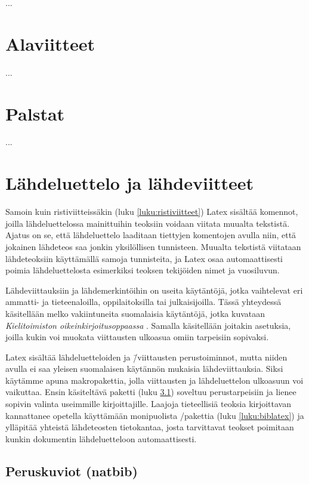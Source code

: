 ...

\section{Alaviitteet}
\label{luku:alaviitteet}

...

\section{Palstat}
\label{luku:palstat}

...

\section{Lähdeluettelo ja lähdeviitteet}
\label{luku:lähteet}

Samoin kuin ristiviitteissäkin (luku \ref{luku:ristiviitteet}) Latex
sisältää komennot, joilla lähdeluettelossa mainittuihin teoksiin voidaan
viitata muualta tekstistä. Ajatus on se, että lähdeluettelo laaditaan
tiettyjen komentojen avulla niin, että jokainen lähdeteos saa jonkin
yksilöllisen tunnisteen. Muualta tekstistä viitataan lähdeteoksiin
käyttämällä samoja tunnisteita, ja Latex osaa automaattisesti poimia
lähdeluettelosta esimerkiksi teoksen tekijöiden nimet ja vuosiluvun.

Lähdeviittauksiin ja lähdemerkintöihin on useita käytäntöjä, jotka
vaihtelevat eri ammatti- ja tieteen\-aloilla, oppilaitoksilla tai
julkaisijoilla. Tässä yhteydessä käsitellään melko vakiintuneita
suomalaisia käytäntöjä, jotka kuvataan \emph{Kielitoimiston
  oikein\-kir\-joi\-tus\-oppaas\-sa} \parencite{kt_oik}. Samalla
käsitellään joitakin asetuksia, joilla kukin voi muokata viittausten
ulkoasua omiin tarpeisiin sopivaksi.

Latex sisältää lähdeluetteloiden ja \=/viittausten perustoiminnot, mutta
niiden avulla ei saa yleisen suomalaisen käytännön mukaisia
lähdeviittauksia. Siksi käytämme apuna makropakettia, jolla viittausten
ja lähdeluettelon ulkoasuun voi vaikuttaa. Ensin käsiteltävä paketti
 (luku \ref{luku:natbib}) soveltuu perustarpeisiin ja
lienee sopivin valinta useimmille kirjoittajille. Laajoja tieteellisiä
teoksia kirjoittavan kannattanee opetella käyttämään monipuolista
\-/pakettia (luku \ref{luku:biblatex}) ja ylläpitää
yhteistä lähdeteosten tietokantaa, josta tarvittavat teokset poimitaan
kunkin dokumentin lähdeluetteloon automaattisesti.

\subsection{Peruskuviot (natbib)}
\label{luku:natbib}

